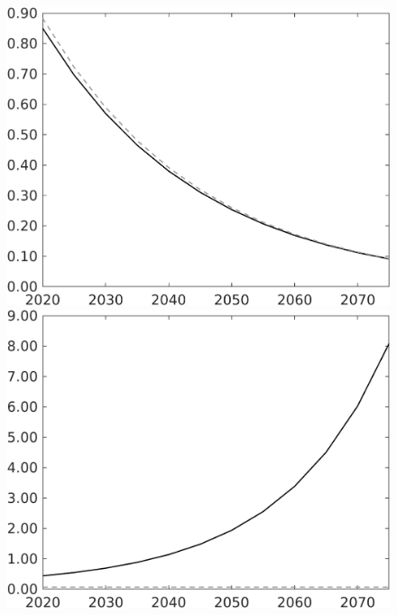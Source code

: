 \documentclass[12pt]{article}
\begin{document}
\begin{figure}[h!!]
\begin{minipage}[]{0.32\textwidth}
\end{minipage}
\begin{minipage}[]{0.32\textwidth}
\includegraphics[width=1\textwidth]{../../codding_model/own_basedOnFried/optimalPol_010922_revision/figures/all_13Sept22/LevTaufNoTauf_TaulCalib_Equlab_regime0_pg_spillover0_nsk0_xgr1_knspil1_sep1_LFlimit0_emsbase0_countec0_GovRev0_etaa0.79_lgd0.png}
\end{minipage}	
\begin{minipage}[]{0.32\textwidth}
\includegraphics[width=1\textwidth]{../../codding_model/own_basedOnFried/optimalPol_010922_revision/figures/all_13Sept22/LevTaufNoTauf_TaulCalib_Equlab_regime0_GFF_spillover0_nsk0_xgr1_knspil1_sep1_LFlimit0_emsbase0_countec0_GovRev0_etaa0.79_lgd0.png}

\end{minipage}
\end{figure}
\end{document}
